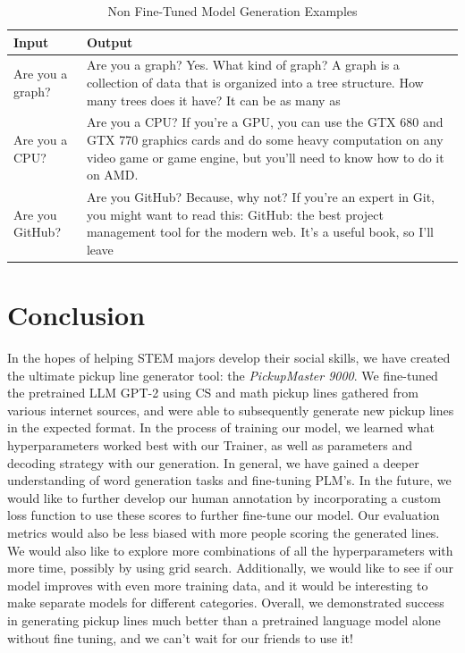 \documentclass[12pt,reqno]{amsart}
\theoremstyle{plain}
\theoremstyle{definition}
\theoremstyle{remark}
\begin{document}
\begin{table}[H]
    \centering
\begin{tabularx}{0.8\textwidth} { 
  | >{\raggedright\arraybackslash}X 
  | >{\raggedright\arraybackslash}X  | }
  \hline
 \textbf{Input}  & \textbf{Output}  \\
 \hline
 Are you a graph? & Are you a graph? Yes. What kind of graph? A graph is a collection of data that is organized into a tree structure. How many trees does it have? It can be as many as \\
 \hline
 Are you a CPU?  & Are you a CPU? If you're a GPU, you can use the GTX 680 and GTX 770 graphics cards and do some heavy computation on any video game or game engine, but you'll need to know how to do it on AMD.   \\
 \hline
 Are you GitHub?  & Are you GitHub? Because, why not? If you're an expert in Git, you might want to read this: GitHub: the best project management tool for the modern web. It's a useful book, so I'll leave  \\
  \hline
\end{tabularx}
    \caption{Non Fine-Tuned Model Generation Examples}
    \label{tab:my_label}
\end{table}



\section{Conclusion}
In the hopes of helping STEM majors develop their social skills, we have created the ultimate pickup line generator tool: the \textit{PickupMaster 9000}. We fine-tuned the pretrained LLM GPT-2 using CS and math pickup lines gathered from various internet sources, and were able to subsequently generate new pickup lines in the expected format. In the process of training our model, we learned what hyperparameters worked best with our Trainer, as well as parameters and decoding strategy with our generation. In general, we have gained a deeper understanding of word generation tasks and fine-tuning PLM's. In the future, we would like to further develop our human annotation by incorporating a custom loss function to use these scores to further fine-tune our model. Our evaluation metrics would also be less biased with more people scoring the generated lines. We would also like to explore more combinations of all the hyperparameters with more time, possibly by using grid search. Additionally, we would like to see if our model improves with even more training data, and it would be interesting to make separate models for different categories. Overall, we demonstrated success in generating pickup lines much better than a pretrained language model alone without fine tuning, and we can't wait for our friends to use it!
\end{document}
